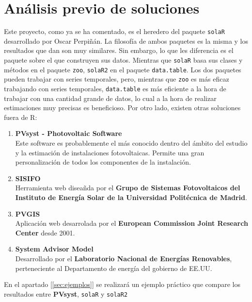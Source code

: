 \section{Análisis previo de soluciones}
\label{sec:org17baf64}
Este proyecto, como ya se ha comentado, es el heredero del paquete \texttt{solaR} desarrollado por Oscar Perpiñán. La filosofía de ambos paquetes es la misma y los resultados que dan son muy similares. Sin embargo, lo que les diferencia es el paquete sobre el que construyen sus datos.
Mientras que \texttt{solaR} basa sus clases y métodos en el paquete \texttt{zoo}, \texttt{solaR2} en el paquete \texttt{data.table}. Los dos paquetes pueden trabajar con series temporales, pero, mientras que \texttt{zoo} es más eficaz trabajando con series temporales, \texttt{data.table} es más eficiente a la hora de trabajar con una cantidad grande de datos, lo cual a la hora de realizar estimaciones muy precisas es beneficioso.
Por otro lado, existen otras soluciones fuera de R:
\begin{enumerate}
\item \textbf{PVsyst - Photovoltaic Software}\\[0pt]
Este software es probablemente el más conocido dentro del ámbito del estudio y la estimación de instalaciones fotovoltaicas. Permite una gran personalización de todos los componentes de la instalación.
\item \textbf{SISIFO}\\[0pt]
Herramienta web diseañda por el \textbf{Grupo de Sistemas Fotovoltaicos del Instituto de Energía Solar de la Universidad Politécnica de Madrid}.
\item \textbf{PVGIS}\\[0pt]
Aplicación web desarrolada por el \textbf{European Commission Joint Research Center} desde 2001.
\item \textbf{System Advisor Model}\\[0pt]
Desarrollado por el \textbf{Laboratorio Nacional de Energías Renovables}, perteneciente al Departamento de energía del gobierno de EE.UU.
\end{enumerate}
En el apartado [\ref{sec:ejemplos}] se realizará un ejemplo práctico que compare los resultados entre \textbf{PVsyst}, \texttt{solaR} y \texttt{solaR2}
